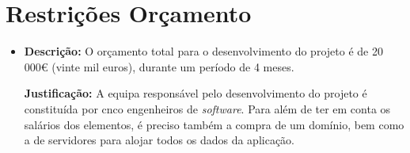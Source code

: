 \section{Restrições Orçamento}
\begin{itemize}
    \item \textbf{Descrição:} O orçamento total para o desenvolvimento do projeto é de 20 000€ (vinte mil euros), durante um período de 4 meses.
    
    \textbf{Justificação:} A equipa responsável pelo desenvolvimento do projeto é constituída por cnco engenheiros de \textit{software}. Para além de ter em conta os salários dos elementos, é preciso também a compra de um domínio, bem como a de servidores para alojar todos os dados da aplicação.
\end{itemize}

